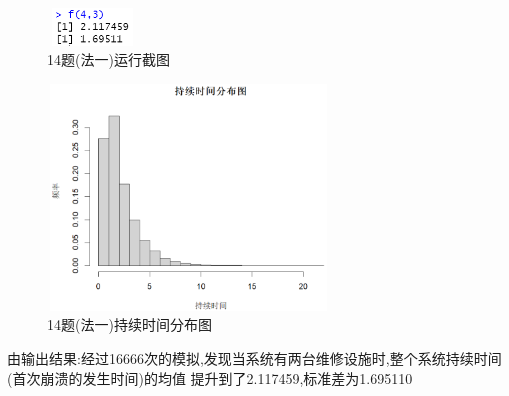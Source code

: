 \documentclass{book}
\begin{document}
\begin{figure}[H]
    \centering
    \includegraphics*[height = 1cm, width = 2.4cm]{gramFile/十四题/14题(法一)运行截图.PNG}
    \caption{14题(法一)运行截图}
\end{figure}
\begin{figure}[H]
    \centering
    \includegraphics*[height = 6cm, width = 7.5cm]{gramFile/十四题/14题(法一)持续时间分布图.PNG}
    \caption{14题(法一)持续时间分布图}
\end{figure}
\noindent
由输出结果:经过16666次的模拟,发现当系统有两台维修设施时,整个系统持续时间(首次崩溃的发生时间)的均值
提升到了2.117459,标准差为1.695110 \\
\end{document}
